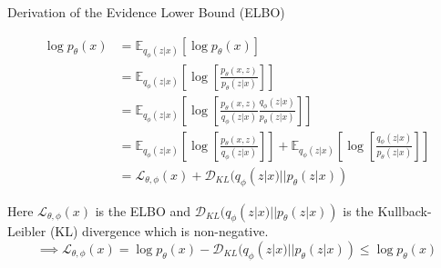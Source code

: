 
Derivation of the Evidence Lower Bound (ELBO)

\begin{equation}
    \begin{aligned}
        \log p_\theta(x) &= \mathbb{E}_{q_\phi(z|x)} \left[ \log p_\theta (x) \right] \\
        &= \mathbb{E}_{q_\phi(z|x)} \left[ \log \left[\frac{ p_\theta (x, z)}{p_\theta (z|x)} \right] \right] \\
        &= \mathbb{E}_{q_\phi(z|x)} \left[ \log \left[\frac{ p_\theta (x, z)}{q_\phi(z|x)} \frac{q_\phi(z|x)}{p_\theta (z|x)} \right] \right] \\
        &= \mathbb{E}_{q_\phi(z|x)} \left[ \log \left[\frac{p_\theta(x, z)}{q_\phi(z|x)} \right] \right] + \mathbb{E}_{q_\phi(z|x)} \left[ \log \left[\frac{q_\phi(z|x)}{p_\theta(z|x)} \right] \right] \\
        &= \mathcal{L}_{\theta, \phi}(x) + \mathcal{D}_{KL}(q_\phi(z|x)||p_\theta(z|x))
    \end{aligned}
\end{equation}

Here $\mathcal{L}_{\theta, \phi}(x)$ is the ELBO and $\mathcal{D}_{KL}(q_\phi(z|x)||p_\theta(z|x))$ is the Kullback-Leibler (KL) divergence which is non-negative.
\begin{equation}
    \implies \mathcal{L}_{\theta, \phi}(x) = \log p_\theta(x) - \mathcal{D}_{KL}(q_\phi(z|x)||p_\theta(z|x)) \leq \log p_\theta(x)
\end{equation}